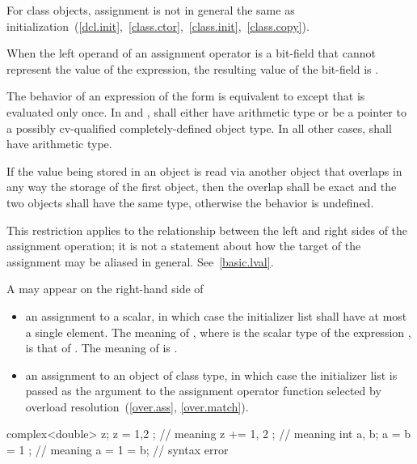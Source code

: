 \pnum
\begin{note}
For class objects, assignment is not in general the same as
initialization~(\ref{dcl.init},~\ref{class.ctor},~\ref{class.init},~\ref{class.copy}).
\end{note}

\pnum
{}%
When the left operand of an assignment operator
is a bit-field that cannot represent the value of the expression, the
resulting value of the bit-field is
.

\pnum
The behavior of an expression of the form  \tcode{=}
 is equivalent to    except
that  is evaluated only once. In \tcode{+=} and \tcode{-=},
 shall either have arithmetic type or be a pointer to a
possibly cv-qualified completely-defined object type. In all other
cases,  shall have arithmetic type.

\pnum
If the value being stored in an object is read via another object that
overlaps in any way the storage of the first object, then the overlap shall be
exact and the two objects shall have the same type, otherwise the behavior is
undefined. \begin{note} This restriction applies to the relationship
between the left and right sides of the assignment operation; it is not a
statement about how the target of the assignment may be aliased in general.
See~\ref{basic.lval}. \end{note}

\pnum
A  may appear on the right-hand side of

\begin{itemize}
\item an assignment to a scalar, in which case the initializer list shall have
at most a single element. The meaning of , where  is the
scalar type of the expression , is that of . The meaning of
 is .

\item an assignment to an object of class type, in which case the initializer
list is passed as the argument to the assignment operator function selected by
overload resolution~(\ref{over.ass}, \ref{over.match}).
\end{itemize}

\begin{example}
\begin{codeblock}
complex<double> z;
z = { 1,2 };              // meaning 
z += { 1, 2 };            // meaning 
int a, b;
a = b = { 1 };            // meaning 
a = { 1 } = b;            // syntax error
\end{codeblock}
\end{example}

